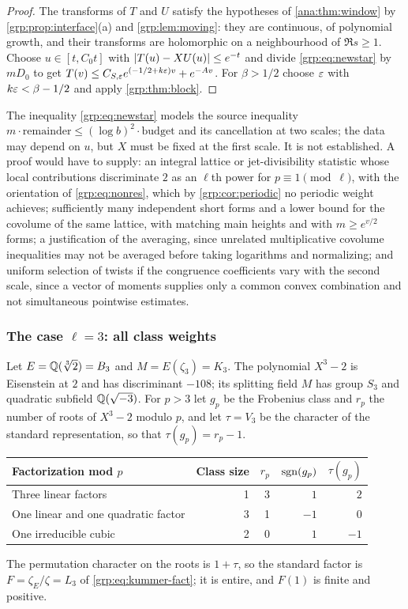 \begin{proof}
The transforms of $T$ and $U$ satisfy the hypotheses of \cref{ana:thm:window}
by \cref{grp:prop:interface}(a) and \cref{grp:lem:moving}: they are continuous,
of polynomial growth, and their transforms are holomorphic on a neighbourhood
of $\Re s\ge1$. Choose $u\in[t,C_0t]$ with $\lvert T(u)-XU(u)\rvert\le e^{-t}$ and
divide \eqref{grp:eq:newstar} by $mD_0$ to get
$T(v)\le C_{S,\varepsilon}e^{(-1/2+k\varepsilon)v}+e^{-Av}$. For $\beta>1/2$ choose $\varepsilon$
with $k\varepsilon<\beta-1/2$ and apply \cref{grp:thm:block}.
\end{proof}

The inequality \eqref{grp:eq:newstar} models the source inequality
$m\cdot\mathrm{remainder}\le(\log b)^2\cdot\mathrm{budget}$ and its
cancellation at two scales; the data may depend on $u$, but $X$ must be fixed
at the first scale. It is not established. A proof would have to supply: an
integral lattice or jet-divisibility statistic whose local contributions
discriminate $2$ as an $\ell$th power for $p\equiv1\pmod\ell$, with the
orientation of \eqref{grp:eq:nonres}, which by \cref{grp:cor:periodic} no
periodic weight achieves; sufficiently many independent short forms and a
lower bound for the covolume of the same lattice, with matching main heights
and with $m\ge e^{v/2}$ forms; a justification of the averaging, since
unrelated multiplicative covolume inequalities may not be averaged before
taking logarithms and normalizing; and uniform selection of twists if the
congruence coefficients vary with the second scale, since a vector of moments
supplies only a common convex combination and not simultaneous pointwise
estimates.

\subsubsection{The case \texorpdfstring{$\ell=3$}{l=3}: all class weights}
Let $E=\mathbb{Q}(\sqrt[3]2)=B_3$ and $M=E(\zeta_3)=K_3$. The polynomial $X^3-2$ is Eisenstein at
$2$ and has discriminant $-108$; its splitting field $M$ has group $S_3$ and quadratic
subfield $\mathbb{Q}(\sqrt{-3})$. For $p>3$ let $g_p$ be the Frobenius class and $r_p$ the number
of roots of $X^3-2$ modulo $p$, and let $\tau=V_3$ be the character of the standard
representation, so that $\tau(g_p)=r_p-1$.
\begin{center}
\begin{tabular}{lrrrr}
\toprule
Factorization mod $p$ & Class size & $r_p$ & $\operatorname{sgn}(g_p)$ & $\tau(g_p)$\\
\midrule
Three linear factors & 1 & 3 & $1$ & $2$\\
One linear and one quadratic factor & 3 & 1 & $-1$ & $0$\\
One irreducible cubic & 2 & 0 & $1$ & $-1$\\
\bottomrule
\end{tabular}
\end{center}
The permutation character on the roots is $1+\tau$, so the standard factor is
$F=\zeta_E/\zeta=L_3$ of \eqref{grp:eq:kummer-fact}; it is entire, and $F(1)$ is finite
and positive.

